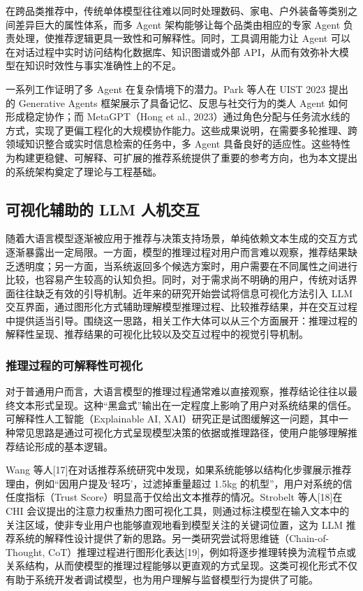 \documentclass{nkuthesis}
\begin{document}
在跨品类推荐中，传统单体模型往往难以同时处理数码、家电、户外装备等类别之间差异巨大的属性体系，而多 Agent 架构能够让每个品类由相应的专家 Agent 负责处理，使推荐逻辑更具一致性和可解释性。同时，工具调用能力让 Agent 可以在对话过程中实时访问结构化数据库、知识图谱或外部 API，从而有效弥补大模型在知识时效性与事实准确性上的不足。

一系列工作证明了多 Agent 在复杂情境下的潜力。Park 等人在 UIST 2023 提出的 Generative Agents 框架展示了具备记忆、反思与社交行为的类人 Agent 如何形成稳定协作；而 MetaGPT（Hong et al., 2023）通过角色分配与任务流水线的方式，实现了更偏工程化的大规模协作能力。这些成果说明，在需要多轮推理、跨领域知识整合或实时信息检索的任务中，多 Agent 具备良好的适应性。这些特性为构建更稳健、可解释、可扩展的推荐系统提供了重要的参考方向，也为本文提出的系统架构奠定了理论与工程基础。

\subsection{可视化辅助的 LLM 人机交互}

随着大语言模型逐渐被应用于推荐与决策支持场景，单纯依赖文本生成的交互方式逐渐暴露出一定局限。一方面，模型的推理过程对用户而言难以观察，推荐结果缺乏透明度；另一方面，当系统返回多个候选方案时，用户需要在不同属性之间进行比较，也容易产生较高的认知负担。同时，对于需求尚不明确的用户，传统对话界面往往缺乏有效的引导机制。近年来的研究开始尝试将信息可视化方法引入 LLM 交互界面，通过图形化方式辅助理解模型推理过程、比较推荐结果，并在交互过程中提供适当引导。围绕这一思路，相关工作大体可以从三个方面展开：推理过程的解释性呈现、推荐结果的可视化比较以及交互过程中的视觉引导机制。

\subsubsection{推理过程的可解释性可视化}

对于普通用户而言，大语言模型的推理过程通常难以直接观察，推荐结论往往以最终文本形式呈现。这种“黑盒式”输出在一定程度上影响了用户对系统结果的信任。可解释性人工智能（Explainable AI, XAI）研究正是试图缓解这一问题，其中一种常见思路是通过可视化方式呈现模型决策的依据或推理路径，使用户能够理解推荐结论形成的基本逻辑。

Wang 等人[17]在对话推荐系统研究中发现，如果系统能够以结构化步骤展示推荐理由，例如“因用户提及‘轻巧’，过滤掉重量超过 1.5kg 的机型”，用户对系统的信任度指标（Trust Score）明显高于仅给出文本推荐的情况。Strobelt 等人[18]在 CHI 会议提出的注意力权重热力图可视化工具，则通过标注模型在输入文本中的关注区域，使非专业用户也能够直观地看到模型关注的关键词位置，这为 LLM 推荐系统的解释性设计提供了新的思路。另一类研究尝试将思维链（Chain-of-Thought, CoT）推理过程进行图形化表达[19]，例如将逐步推理转换为流程节点或关系结构，从而使模型的推理过程能够以更直观的方式呈现。这类可视化形式不仅有助于系统开发者调试模型，也为用户理解与监督模型行为提供了可能。
\end{document}
